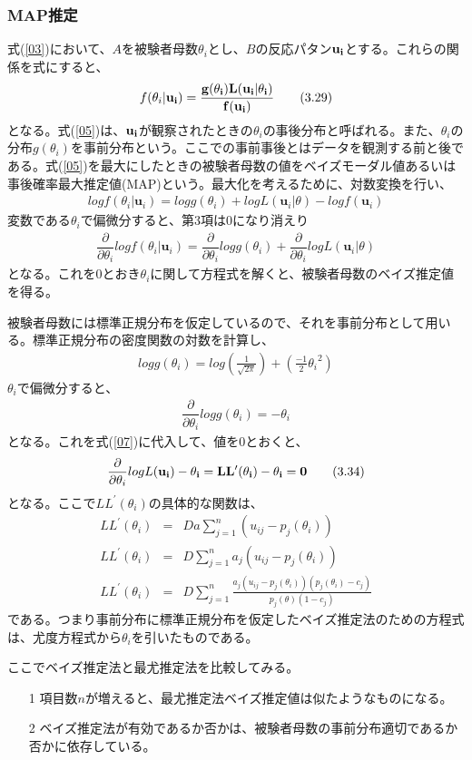 \documentclass[12pt]{jarticle}
\begin{document}
\subsubsection{MAP推定}
式(\ref{03})において、$A$を被験者母数$\theta_i$とし、$B$の反応パタン$\displaystyle \bf u_i$とする。これらの関係を式にすると、
\begin{align}
  \label{05}
  \displaystyle f(\theta_i|\bf{u_i}) = \frac{g(\theta_i)L(\bf{u_i}|\theta_i)}{f(\bf{u_i})} \tag{3.29}
\end{align}
となる。式(\ref{05})は、$\bf{u_i}$が観察されたときの$\theta_i$の事後分布と呼ばれる。また、$\theta_i$の分布$g(\theta_i)$を事前分布という。ここでの事前事後とはデータを観測する前と後である。式(\ref{05})を最大にしたときの被験者母数の値をベイズモーダル値あるいは事後確率最大推定値(MAP)という。最大化を考えるために、対数変換を行い、
\begin{align}
  \label{06}
  \displaystyle log f(\theta_i|\boldsymbol u_i) = log g(\theta_i) + log L(\boldsymbol u_i|\theta) - log f(\boldsymbol u_i) \tag{3.30}
\end{align}
変数である$\theta_i$で偏微分すると、第$3$項は$0$になり消えり
\begin{align}
  \label{07}
  \displaystyle \dfrac{\partial }{\partial \theta_i} log f(\theta_i|\boldsymbol u_i) = \dfrac{\partial }{\partial \theta_i} log g(\theta_i) + \dfrac{\partial }{\partial \theta_i} log L(\boldsymbol u_i|\theta)  \tag{3.31}
\end{align}
となる。これを$0$とおき$\theta_i$に関して方程式を解くと、被験者母数のベイズ推定値を得る。

被験者母数には標準正規分布を仮定しているので、それを事前分布として用いる。標準正規分布の密度関数の対数を計算し、
\begin{align}
  \label{08}
  \displaystyle log g(\theta_i) = log \left(\frac{1}{\sqrt{2\pi}}\right) + \left(\frac{-1}{2} {\theta_i}^2\right)  \tag{3.32}
\end{align}
$\theta_i$で偏微分すると、
\begin{align}
  \label{09}
  \displaystyle   \dfrac{\partial }{\partial \theta_i} log g(\theta_i) = -\theta_i \tag{3.33}
\end{align}
となる。これを式(\ref{07})に代入して、値を$0$とおくと、
\begin{align}
  \label{10}
  \displaystyle  \dfrac{\partial }{\partial \theta_i}log L(\bf u_i) - \theta_i  = LL^{\prime}(\theta_i) - \theta_i = 0 \tag{3.34}
\end{align}
となる。ここで$LL^{\prime}(\theta_i)$の具体的な関数は、
\begin{eqnarray*}
  \label{11}
  \displaystyle  LL^{\prime}(\theta_i) &=& Da \sum_{j = 1}^{n} (u_{ij} - p_j (\theta_i)) \\
  LL^{\prime}(\theta_i) &=& D \sum_{j = 1}^{n} a_j(u_{ij} - p_j (\theta_i)) \\
  LL^{\prime}(\theta_i) &=& D \sum_{j = 1}^{n} \frac{a_j(u_{ij} - p_j (\theta_i))(p_j(\theta_i) - c_j)}{p_j(\theta)(1 - c_j)}
\end{eqnarray*}
である。つまり事前分布に標準正規分布を仮定したベイズ推定法のための方程式は、尤度方程式から$\theta_i$を引いたものである。

ここでベイズ推定法と最尤推定法を比較してみる。
\begin{itemize}
  \item[1] 項目数$n$が増えると、最尤推定法ベイズ推定値は似たようなものになる。
  \item[2] ベイズ推定法が有効であるか否かは、被験者母数の事前分布適切であるか否かに依存している。
\end{itemize}
\end{document}
